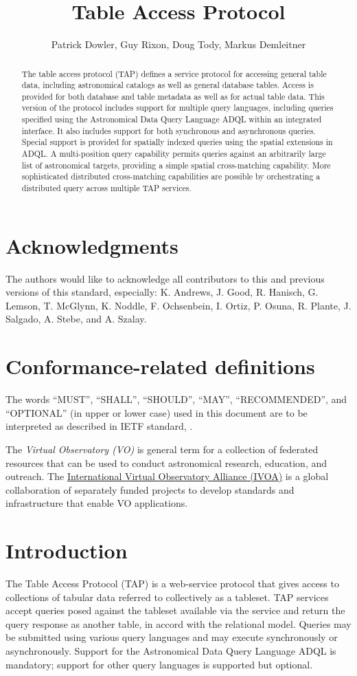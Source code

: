 \documentclass[11pt,letter]{ivoa}
\title{Table Access Protocol}
\author{Patrick Dowler, Guy Rixon, Doug Tody, Markus Demleitner}
\begin{document}
\begin{abstract}
The table access protocol (TAP) defines a service protocol for accessing general 
table data, including astronomical catalogs as well as general database tables. 
Access is provided for both database and table metadata as well as for actual 
table data. This version of the protocol includes support for multiple query 
languages, including queries specified using the Astronomical Data Query 
Language ADQL  within an integrated interface. It also includes 
support 
for both synchronous and asynchronous queries. Special support is provided for
spatially indexed queries using the spatial extensions in ADQL. A multi-position 
query capability permits queries against an arbitrarily large list of 
astronomical targets, providing a simple spatial cross-matching capability. 
More sophisticated distributed cross-matching capabilities are possible by 
orchestrating a distributed query across multiple TAP services.  
\end{abstract}


\section*{Acknowledgments}

The authors would like to acknowledge all contributors to this and previous 
versions of this standard, especially: K. Andrews, J. Good, R. Hanisch, G. 
Lemson, T. McGlynn, K. Noddle, F. Ochsenbein, I. Ortiz, P. Osuna, R. Plante, 
J. Salgado, A. Stebe, and A. Szalay.


\section*{Conformance-related definitions}

The words ``MUST'', ``SHALL'', ``SHOULD'', ``MAY'', ``RECOMMENDED'', and
``OPTIONAL'' (in upper or lower case) used in this document are to be
interpreted as described in IETF standard, \citet{std:RFC2119}.

The \emph{Virtual Observatory (VO)} is general term for a collection of 
federated resources that can be used to conduct astronomical research, 
education, and outreach. The \href{http://www.ivoa.net}{International
Virtual Observatory Alliance (IVOA)} is a global collaboration of separately 
funded projects to develop standards and infrastructure that enable VO 
applications.


\section{Introduction}
The Table Access Protocol (TAP) is a web-service protocol that gives access to 
collections of tabular data referred to collectively as a tableset.  TAP 
services accept queries posed against the tableset available via the service and 
return the query response as another table, in accord with the relational model. 
 Queries may be submitted using various query languages and may execute 
synchronously or asynchronously. Support for the Astronomical Data Query 
Language ADQL \citep{std:ADQL} is mandatory; support for other query languages is 
supported 
but optional.
\end{document}
